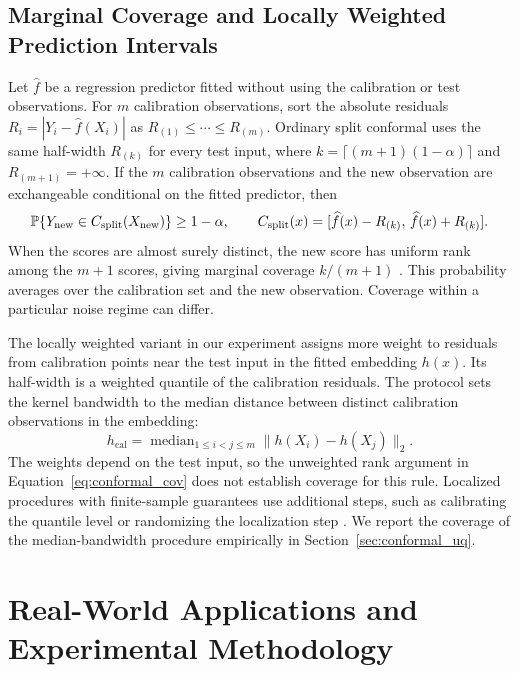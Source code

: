 \documentclass{article}
\begin{document}
\subsection{Marginal Coverage and Locally Weighted Prediction Intervals}
\label{sec:uq}

Let $\widehat f$ be a regression predictor fitted without using the calibration or test observations. For $m$ calibration observations, sort the absolute residuals $R_i=|Y_i-\widehat f(X_i)|$ as $R_{(1)}\le\cdots\le R_{(m)}$. Ordinary split conformal uses the same half-width $R_{(k)}$ for every test input, where $k=\lceil(m+1)(1-\alpha)\rceil$ and $R_{(m+1)}=+\infty$. If the $m$ calibration observations and the new observation are exchangeable conditional on the fitted predictor, then
\begin{equation}
\label{eq:conformal_cov}
\mathbb P\!\left\{Y_{\rm new}\in C_{\rm split}(X_{\rm new})\right\}\geq 1-\alpha,
\qquad C_{\rm split}(x)=[\widehat f(x)-R_{(k)},\,\widehat f(x)+R_{(k)}].
\end{equation}
When the scores are almost surely distinct, the new score has uniform rank among the $m+1$ scores, giving marginal coverage $k/(m+1)$ \cite{vovk2005algorithmic, shafer2008tutorial}. This probability averages over the calibration set and the new observation. Coverage within a particular noise regime can differ.

The locally weighted variant in our experiment assigns more weight to residuals from calibration points near the test input in the fitted embedding $h(x)$. Its half-width is a weighted quantile of the calibration residuals. The protocol sets the kernel bandwidth to the median distance between distinct calibration observations in the embedding:
\begin{equation}
\label{eq:h_cal}
h_{\text{cal}}=\operatorname{median}_{1\leq i<j\leq m}\|h(X_i)-h(X_j)\|_2 .
\end{equation}
The weights depend on the test input, so the unweighted rank argument in Equation~\eqref{eq:conformal_cov} does not establish coverage for this rule. Localized procedures with finite-sample guarantees use additional steps, such as calibrating the quantile level \cite{guan2023lcp} or randomizing the localization step \cite{hore2025rlcp}. We report the coverage of the median-bandwidth procedure empirically in Section~\ref{sec:conformal_uq}.

\section{Real-World Applications and Experimental Methodology}
\end{document}
